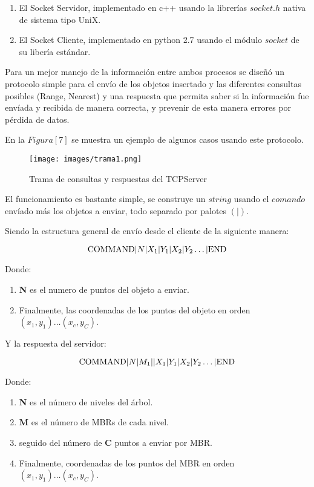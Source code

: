 \documentclass[12pt]{article}
\begin{document}
\begin{enumerate}
\item El Socket Servidor, implementado en c++ usando la librerías $socket.h$ nativa de sistema tipo UniX.
\item El Socket Cliente, implementado en python 2.7 usando el módulo $socket$ de su libería estándar.
\end{enumerate}

Para un mejor manejo de la información entre ambos procesos se diseñó un protocolo simple para el envío de los objetos insertado y las diferentes consultas posibles (Range, Nearest) y una respuesta que permita saber si la información fue envíada y recibida de manera correcta, y prevenir de esta manera errores por pérdida de datos.

En la $Figura [7]$ se muestra un ejemplo de algunos casos usando este protocolo.

\newpage

\begin{figure}
\centering
\texttt{[image: images/trama1.png]}
\centering
\caption{Trama de consultas y respuestas del TCPServer}
\end{figure}

El funcionamiento es bastante simple, se construye un $string$ usando el $comando$ envíado más los objetos a enviar, todo separado por palotes $(|)$.

Siendo la estructura general de envío desde el cliente de la siguiente manera:

\[
    \textup{COMMAND} |N|X_1|Y_1|X_2|Y_2 \dots | \textup{END}
 \]
 
 Donde:
\begin{enumerate}
\item \textbf{N} es el numero de puntos del objeto a enviar.
\item Finalmente, las coordenadas de los puntos del objeto en orden $(x_1,y_1)\dots (x_c,y_C)$.
\end{enumerate}

Y la respuesta del servidor:

 \[
    \textup{COMMAND} |N|M_1||X_1|Y_1|X_2|Y_2 \dots | \textup{END}
 \]

Donde:
\begin{enumerate}
\item \textbf{N} es el número de niveles del árbol.
\item \textbf{M} es el número de MBRs de cada nivel.
\item seguido del número de \textbf{C} puntos a enviar por MBR.
\item Finalmente, coordenadas de los puntos del MBR en orden $(x_1,y_1)\dots (x_c,y_C)$.
\end{enumerate}
\newpage
\end{document}
